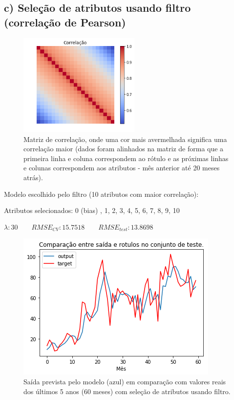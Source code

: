 \documentclass[a4paper, 12pt]{article}
\begin{document}
\subsection*{c) Seleção de atributos usando filtro (correlação de Pearson)}

\begin{figure}[h!]
    \centering
    \includegraphics[width=6cm]{images/corr.png}
    \caption{Matriz de correlação, onde uma cor mais avermelhada significa uma correlação maior (dados foram alinhados na matriz de forma que a primeira linha e coluna correspondem ao rótulo e as próximas linhas e colunas correspondem aos atributos - mês anterior até 20 meses atrás).}
\end{figure}

Modelo escolhido pelo filtro (10 atributos com maior correlação):

Atributos selecionados: 0 (bias) , 1, 2, 3, 4, 5, 6, 7, 8, 9, 10

$\lambda: 30 \quad\quad RMSE_{CV}: 15.7518 \quad\quad RMSE_{test}: 13.8698$

\begin{figure}[h!]
    \centering
  \includegraphics[width=10cm]{images/filter.png}
    \caption{Saída prevista pelo modelo (azul) em comparação com valores reais dos últimos 5 anos (60 meses) com seleção de atributos usando filtro.}
\end{figure}
\end{document}
